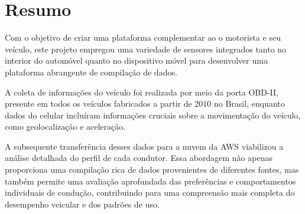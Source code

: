 \chapter*{Resumo}

Com o objetivo de criar uma plataforma complementar ao o motorista e seu veículo, este projeto empregou uma variedade de sensores integrados tanto no interior do automóvel quanto no dispositivo móvel para desenvolver uma plataforma abrangente de compilação de dados.

A coleta de informações do veículo foi realizada por meio da porta OBD-II, presente em todos os veículos fabricados a partir de 2010 no Brasil, enquanto dados do celular incluíram informações cruciais sobre a movimentação do veículo, como geolocalização e aceleração.

A subsequente transferência desses dados para a nuvem da AWS viabilizou a análise detalhada do perfil de cada condutor. Essa abordagem não apenas proporciona uma compilação rica de dados provenientes de diferentes fontes, mas também permite uma avaliação aprofundada das preferências e comportamentos individuais de condução, contribuindo para uma compreensão mais completa do desempenho veicular e dos padrões de uso.

